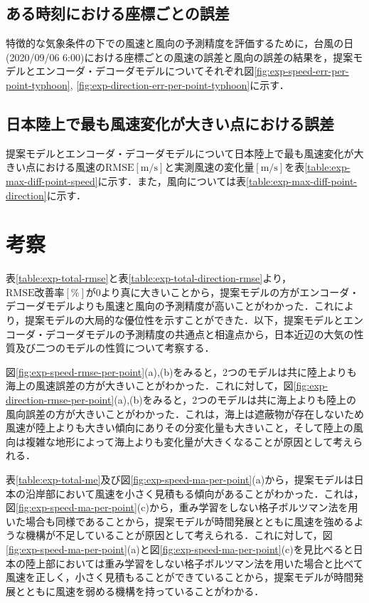 \subsection{ある時刻における座標ごとの誤差 \label{subsection:exp-results-per-point-at-time}}
特徴的な気象条件の下での風速と風向の予測精度を評価するために，台風の日(2020/09/06 6:00)における座標ごとの風速の誤差と風向の誤差の結果を，提案モデルとエンコーダ・デコーダモデルについてそれぞれ図\ref{fig:exp-speed-err-per-point-typhoon}, \ref{fig:exp-direction-err-per-point-typhoon}に示す．

\subsection{日本陸上で最も風速変化が大きい点における誤差 \label{subsec:exp-results-at-max-diff-point}}
提案モデルとエンコーダ・デコーダモデルについて日本陸上で最も風速変化が大きい点における風速の$\mathrm{RMSE[m/s]}$と実測風速の変化量$\mathrm{[m/s]}$を表\ref{table:exp-max-diff-point-speed}に示す．また，風向については表\ref{table:exp-max-diff-point-direction}に示す．

\section{考察 \label{section:exp-discussion}}
表\ref{table:exp-total-rmse}と表\ref{table:exp-total-direction-rmse}より，$\mathrm{RMSE改善率[\%]}$が0より真に大きいことから，提案モデルの方がエンコーダ・デコーダモデルよりも風速と風向の予測精度が高いことがわかった．これにより，提案モデルの大局的な優位性を示すことができた．以下，提案モデルとエンコーダ・デコーダモデルの予測精度の共通点と相違点から，日本近辺の大気の性質及び二つのモデルの性質について考察する．

図\ref{fig:exp-speed-rmse-per-point}(a),(b)をみると，2つのモデルは共に陸上よりも海上の風速誤差の方が大きいことがわかった．これに対して，図\ref{fig:exp-direction-rmse-per-point}(a),(b)をみると，2つのモデルは共に海上よりも陸上の風向誤差の方が大きいことがわかった．これは，海上は遮蔽物が存在しないため風速が陸上よりも大きい傾向にありその分変化量も大きいこと，そして陸上の風向は複雑な地形によって海上よりも変化量が大きくなることが原因として考えられる．

表\ref{table:exp-total-me}及び図\ref{fig:exp-speed-ma-per-point}(a)から，提案モデルは日本の沿岸部において風速を小さく見積もる傾向があることがわかった．これは，図\ref{fig:exp-speed-ma-per-point}(c)から，重み学習をしない格子ボルツマン法を用いた場合も同様であることから，提案モデルが時間発展とともに風速を強めるような機構が不足していることが原因として考えられる．これに対して，図\ref{fig:exp-speed-ma-per-point}(a)と図\ref{fig:exp-speed-ma-per-point}(c)を見比べると日本の陸上部においては重み学習をしない格子ボルツマン法を用いた場合と比べて風速を正しく，小さく見積もることができていることから，提案モデルが時間発展とともに風速を弱める機構を持っていることがわかる．

